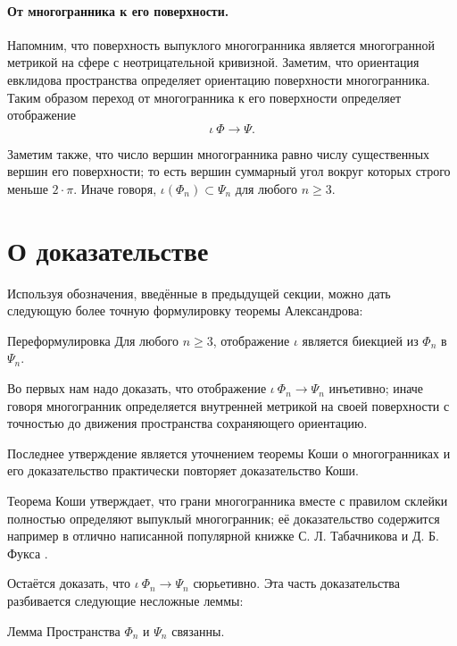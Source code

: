\documentclass[oneside,a4paper]{article}
\begin{document}
\paragraph{От многогранника к его поверхности.}
Напомним, что поверхность выпуклого многогранника является многогранной метрикой на сфере с неотрицательной кривизной.
Заметим, что ориентация евклидова пространства определяет ориентацию поверхности многогранника.
Таким образом переход от многогранника к его поверхности определяет отображение 
\[\iota\:\Phi\to \Psi.\]

Заметим также, что число вершин многогранника равно числу существенных вершин его поверхности;
то есть вершин суммарный угол вокруг которых строго меньше $2\cdot\pi$.
Иначе говоря, $\iota(\Phi_n)\subset \Psi_n$ для любого $n\ge 3$.

\section{О доказательстве}

Используя обозначения, введённые в предыдущей секции, можно дать следующую более точную формулировку теоремы Александрова:

\begin{thm}{Переформулировка}
Для любого $n\ge 3$,
отображение $\iota$ является биекцией из $\Phi_n$ в $\Psi_n$.
\end{thm}


Во первых нам надо доказать, что отображение $\iota\:\Phi_n\to\Psi_n$ инъетивно; иначе говоря многогранник определяется внутренней метрикой на своей поверхности с точностью до движения пространства сохраняющего ориентацию.

Последнее утверждение является уточнением теоремы Коши о многогранниках и его доказательство практически повторяет доказательство Коши.

Теорема Коши утверждает, что грани многогранника вместе с правилом склейки полностью определяют выпуклый многогранник;
её доказательство содержится например в отлично написанной популярной книжке С. Л. Табачникова и Д. Б. Фукса \cite{tabacnikov-fuks}.

\medskip

Остаётся доказать, что $\iota\:\Phi_n\to\Psi_n$ сюрьетивно.
Эта часть доказательства разбивается следующие несложные леммы:

\begin{thm}{Лемма}
Пространства $\Phi_n$ и $\Psi_n$ связанны.
\end{thm}
\end{document}
